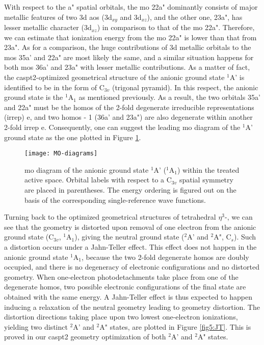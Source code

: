 \begin{refsection}
With respect to the a" spatial orbitals, the \acrshort{mo} 22a" dominantly consists of major metallic features of two 3d \acrshort{ao}s (3d$_{xy}$ and 3d$_{xz}$), and the other one, 23a", has lesser metallic character (3d$_{xz}$) in comparison to that of the \acrshort{mo} 22a". Therefore, we can estimate that ionization energy from the \acrshort{mo} 22a" is lower than that from 23a". As for a comparison, the huge contributions of 3d metallic orbitals to the \acrshort{mo}s 35a' and 22a" are most likely the same, and a similar situation happens for both \acrshort{mo}s 36a' and 23a" with lesser metallic contributions. As a matter of fact, the \acrshort{caspt2}-optimized geometrical structure of the anionic ground state $^1$A' is identified to be in the form of C$_{3v}$ (trigonal pyramid). In this respect, the anionic ground state is the $^1$A$_1$ as mentioned previously. As a result, the two orbitals 35a' and 22a" must be the \acrshort{homo}s of the 2-fold degenerate irreducible representations (irrep) e, and two \acrshort{homo}s - 1 (36a' and 23a") are also degenerate within another 2-fold irrep e. Consequently, one can suggest the leading \acrshort{mo} diagram of the $^1$A' ground state as the one plotted in Figure \ref{fig5:MO-diagram}.



\begin{figure}[htb!]
    \centering
    \texttt{[image: MO-diagrams]}
    \caption{\acrshort{mo} diagram of the anionic ground state $^1$A' ($^1$A$_1$) within the treated active space. Orbital labels with respect to a C$_{3v}$ spatial symmetry are placed in parentheses. The energy ordering is figured out on the basis of the corresponding single-reference wave functions.} 
    \label{fig5:MO-diagram}
\end{figure} 






Turning back to the optimized geometrical structures of tetrahedral $\eta^3$-, we can see that the geometry is distorted upon removal of one electron from the anionic ground state (C$_{3v}$, $^1$A$_1$), giving the neutral ground state ($^2$A' and $^2$A", C$_s$). Such a distortion occurs under a Jahn-Teller effect. This effect does not happen in the anionic ground state $^1$A$_1$, because the two 2-fold degenerate \acrshort{homo}s are doubly occupied, and there is no degeneracy of electronic configurations and no distorted geometry. When one-electron photodetachments take place from one of the degenerate \acrshort{homo}s, two possible electronic configurations of the final state are obtained with the same energy. A Jahn-Teller effect is thus expected to happen inducing a relaxation of the neutral geometry leading to geometry distortion. The distortion directions taking place upon two lowest one-electron ionizations, yielding two distinct $^2$A' and $^2$A" states, are plotted in Figure \ref{fig5:JT}. This is proved in our \acrshort{caspt2} geometry optimization of both $^2$A' and $^2$A" states.





\end{refsection}
